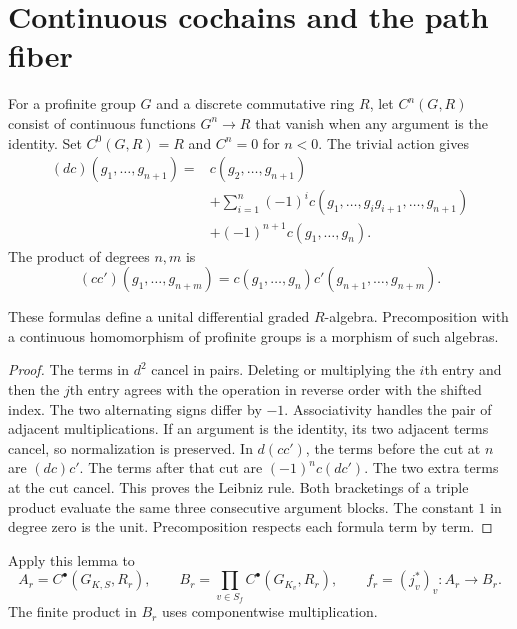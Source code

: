 \section{Continuous cochains and the path fiber}

For a profinite group $G$ and a discrete commutative ring $R$, let
$C^n(G,R)$ consist of continuous functions $G^n\to R$ that vanish
when any argument is the identity. Set $C^0(G,R)=R$ and $C^n=0$ for
$n<0$. The trivial action gives
\begin{align}
 (dc)(g_1,\ldots,g_{n+1})
 ={}&c(g_2,\ldots,g_{n+1})\nonumber\\
 &+\sum_{i=1}^{n}(-1)^i
 c(g_1,\ldots,g_ig_{i+1},\ldots,g_{n+1})\nonumber\\
 &+(-1)^{n+1}c(g_1,\ldots,g_n).
 \label{v4-arith:relative-bar:eq:cochains}
\end{align}
The product of degrees $n,m$ is
\[
 (cc')(g_1,\ldots,g_{n+m})
 =c(g_1,\ldots,g_n)c'(g_{n+1},\ldots,g_{n+m}).
\]

\begin{lemma}\label{v4-arith:relative-bar:lem:cochains}
These formulas define a unital differential graded $R$-algebra.
Precomposition with a continuous homomorphism of profinite groups is
a morphism of such algebras.
\end{lemma}
\begin{proof}
The terms in $d^2$ cancel in pairs. Deleting or multiplying the $i$th
entry and then the $j$th entry agrees with the operation in reverse
order with the shifted index. The two alternating signs differ by
$-1$. Associativity handles the pair of adjacent multiplications.
If an argument is the identity, its two adjacent terms cancel, so
normalization is preserved. In $d(cc')$, the terms before the cut at
$n$ are $(dc)c'$. The terms after that cut are $(-1)^nc(dc')$.
The two extra terms at the cut cancel. This proves the Leibniz rule.
Both bracketings of a triple product evaluate the same three
consecutive argument blocks. The constant $1$ in degree zero is the
unit. Precomposition respects each formula term by term.
\end{proof}

Apply this lemma to
\[
 A_r=C^\bullet(G_{K,S},R_r),\qquad
 B_r=\prod_{v\in S_f}C^\bullet(G_{K_v},R_r),\qquad
 f_r=(j_v^*)_v:A_r\longrightarrow B_r.
\]
The finite product in $B_r$ uses componentwise multiplication.

